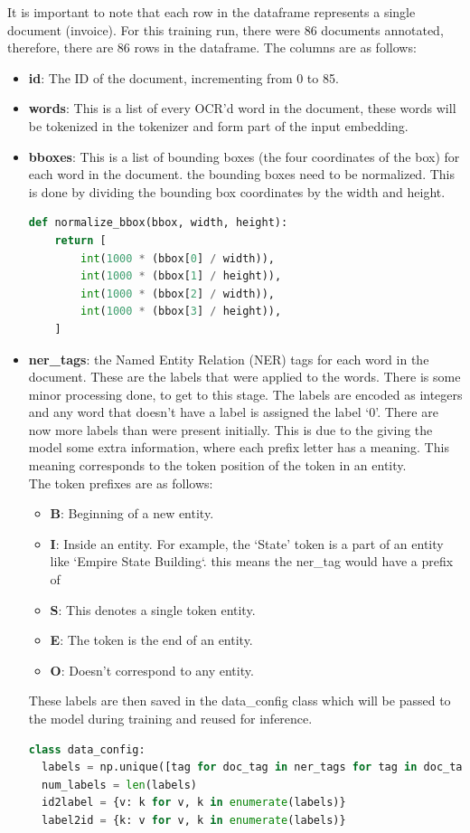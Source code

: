 It is important to note that each row in the dataframe represents a single document (invoice). For this training run,
there were 86 documents annotated, therefore, there are 86 rows in the dataframe. The columns are as follows:
\begin{itemize}
	\item \textbf{id}: The ID of the document, incrementing from 0 to 85.
	\item \textbf{words}: This is a list of every OCR'd word in the document, these words will be tokenized in the tokenizer
	      and form part of the input embedding.
	\item \textbf{bboxes}: This is a list of bounding boxes (the four coordinates of the box) for each word in the document.
	      the bounding boxes need to be normalized. This is done by dividing the bounding box coordinates by the width and height.
	      \begin{lstlisting}[language=python, label={lst:bbox_normalization}, caption={Bounding Box Normalization.}]
	def normalize_bbox(bbox, width, height):
    return [
        int(1000 * (bbox[0] / width)),
        int(1000 * (bbox[1] / height)),
        int(1000 * (bbox[2] / width)),
        int(1000 * (bbox[3] / height)),
    ]
	\end{lstlisting}
	\item \textbf{ner\_tags}: the Named Entity Relation (NER) tags for each word in the document. These are the labels
	      that were applied to the words. There is some minor processing done, to get to this stage. The labels are
	      encoded as integers and any word that doesn't have a label is assigned the label `0'.
	      \bigbreak
	      There are now more labels than were present initially. This is due to the giving the model some extra information,
	      where each prefix letter has a meaning. This meaning corresponds to the token position of the token in an entity.\\
	      The token prefixes are as follows:
	      \begin{itemize}
		      \item \textbf{B}: Beginning of a new entity.
		      \item \textbf{I}: Inside an entity. For example, the `State' token is a part of an entity like `Empire State Building`.
		            this means the ner\_tag would have a prefix of ~\autocite{TokenClassification}
		      \item \textbf{S}: This denotes a single token entity.
		      \item \textbf{E}: The token is the end of an entity.
		      \item \textbf{O}: Doesn't correspond to any entity.
	      \end{itemize}
	      These labels are then saved in the data\_config class which will be passed to the model during training and reused
	      for inference.
	      \begin{lstlisting}[language=python, label={lst:data_config}, caption={Data Config.}]
class data_config:
  labels = np.unique([tag for doc_tag in ner_tags for tag in doc_tag]).tolist()
  num_labels = len(labels)
  id2label = {v: k for v, k in enumerate(labels)}
  label2id = {k: v for v, k in enumerate(labels)}
	

\end{lstlisting}
\end{itemize}
